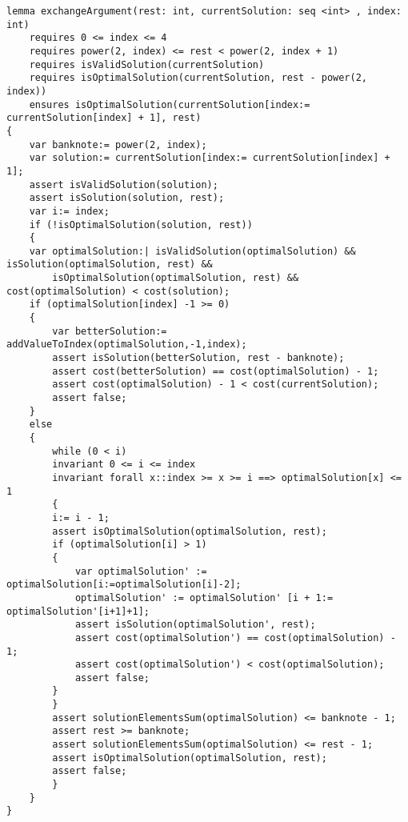     \begin{lstlisting}
lemma exchangeArgument(rest: int, currentSolution: seq <int> , index: int)
    requires 0 <= index <= 4
    requires power(2, index) <= rest < power(2, index + 1)
    requires isValidSolution(currentSolution)
    requires isOptimalSolution(currentSolution, rest - power(2, index))
    ensures isOptimalSolution(currentSolution[index:= currentSolution[index] + 1], rest) 
{
    var banknote:= power(2, index);
    var solution:= currentSolution[index:= currentSolution[index] + 1];
    assert isValidSolution(solution);
    assert isSolution(solution, rest);
    var i:= index;
    if (!isOptimalSolution(solution, rest)) 
    {
    var optimalSolution:| isValidSolution(optimalSolution) && isSolution(optimalSolution, rest) &&
        isOptimalSolution(optimalSolution, rest) && cost(optimalSolution) < cost(solution);
    if (optimalSolution[index] -1 >= 0) 
    {
        var betterSolution:= addValueToIndex(optimalSolution,-1,index);
        assert isSolution(betterSolution, rest - banknote);
        assert cost(betterSolution) == cost(optimalSolution) - 1;
        assert cost(optimalSolution) - 1 < cost(currentSolution);
        assert false;
    } 
    else 
    {
        while (0 < i)
        invariant 0 <= i <= index
        invariant forall x::index >= x >= i ==> optimalSolution[x] <= 1 
        {
        i:= i - 1;
        assert isOptimalSolution(optimalSolution, rest);
        if (optimalSolution[i] > 1) 
        {
            var optimalSolution' := optimalSolution[i:=optimalSolution[i]-2];
            optimalSolution' := optimalSolution' [i + 1:= optimalSolution'[i+1]+1];
            assert isSolution(optimalSolution', rest);
            assert cost(optimalSolution') == cost(optimalSolution) - 1;
            assert cost(optimalSolution') < cost(optimalSolution);
            assert false;
        }
        }
        assert solutionElementsSum(optimalSolution) <= banknote - 1;
        assert rest >= banknote; 
        assert solutionElementsSum(optimalSolution) <= rest - 1; 
        assert isOptimalSolution(optimalSolution, rest); 
        assert false;
        }
    }
}
    \end{lstlisting}
        
    

